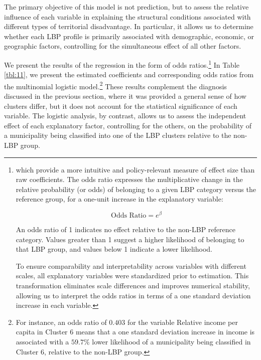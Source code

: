 \documentclass[a4paper,11pt,oneside]{article}
\begin{document}
The primary objective of this model is not prediction, but to assess the relative influence of each variable in explaining the structural conditions associated with different types of territorial disadvantage. In particular, it allows us to determine whether each LBP profile is primarily associated with demographic, economic, or geographic factors, controlling for the simultaneous effect of all other factors.

We present the results of the regression in the form of odds ratios.\footnote{which provide a more intuitive and policy-relevant measure of effect size than raw coefficients. The odds ratio expresses the multiplicative change in the relative probability (or odds) of belonging to a given LBP category versus the reference group, for a one-unit increase in the explanatory variable:

\begin{equation}
\label{eq:odds_ratio}
\text{Odds Ratio} = e^{\beta}
\end{equation}


\noindent An odds ratio of 1 indicates no effect relative to the non-LBP reference category. Values greater than 1 suggest a higher likelihood of belonging to that LBP group, and values below 1 indicate a lower likelihood.

To ensure comparability and interpretability across variables with different scales, all explanatory variables were standardized prior to estimation. This transformation eliminates scale differences and improves numerical stability, allowing us to interpret the odds ratios in terms of a one standard deviation increase in each variable.} In Table \ref{tbl:11}, we present the estimated coefficients and corresponding odds ratios from the multinomial logistic model.\footnote{For instance, an odds ratio of $0.403$ for the variable Relative income per capita in Cluster 6 means that a one standard deviation increase in income is associated with a $59.7\%$ lower likelihood of a municipality being classified in Cluster 6, relative to the non-LBP group.} These results complement the diagnosis discussed in the previous section, where it was provided a general sense of how clusters differ, but it does not account for the statistical significance of each variable. The logistic analysis, by contrast, allows us to assess the independent effect of each explanatory factor, controlling for the others, on the probability of a municipality being classified into one of the LBP clusters relative to the non-LBP group.
\end{document}
